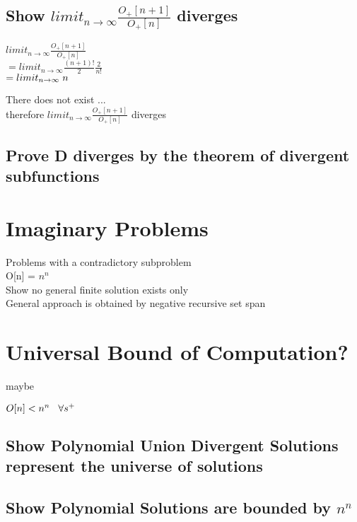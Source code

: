 \documentclass[11pt]{article}
\begin{document}
\subsection{Show $limit_{n \rightarrow \infty}\frac{O_+[n+1]}{O_+[n]}$ diverges}
\begin{center}
$
limit_{n \rightarrow \infty}\frac{O_+[n+1]}{O_+[n]}
$
\\ \vspace{2mm}
$
= limit_{n \rightarrow \infty}\frac{(n+1)!}{2} \frac{2}{n!}
$
\\ \vspace{2mm}
$
= limit_{n \rightarrow \infty}\hspace{1mm} n
$
\end{center}
There does not exist ... \\
therefore $limit_{n \rightarrow \infty}\frac{O_+[n+1]}{O_+[n]}$ diverges



\subsection{Prove D diverges by the theorem of divergent subfunctions}





\newpage
\section{Imaginary Problems}
Problems with a contradictory subproblem\\
O[n] = $n^n$\\
Show no general finite solution exists only\\
General approach is obtained by negative recursive set span


\newpage
\section{Universal Bound of Computation?}
maybe
\begin{center}
$
O[n] < n^n \hspace{3mm} \forall s^+
$
\end{center}

\subsection{Show Polynomial Union Divergent Solutions represent the universe of solutions}
\subsection{Show Polynomial Solutions are bounded by $n^n$}
\end{document}
